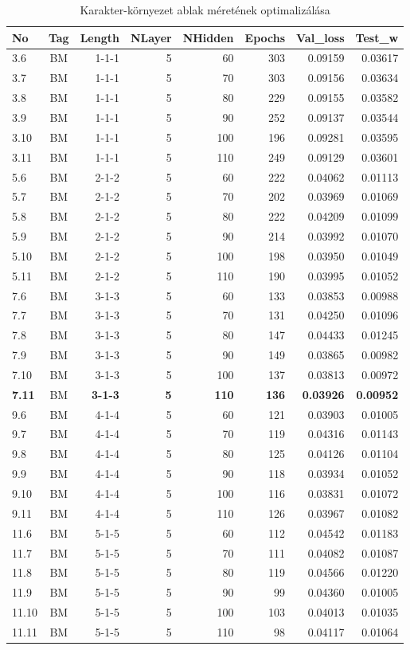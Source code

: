 \documentclass[a4paper, magyar]{article}
\begin{document}
\begin{small}
\begin{table}[tp]\centering
\begin{tabular}{|l|c|r|r|r|r|r|r|}
			\hline
			No&Tag&Length&NLayer&NHidden&Epochs&Val\_loss&Test\_w\\
\hline\hline
3.6&BM&1-1-1&5&60&303&0.09159&0.03617\\
\hline
3.7&BM&1-1-1&5&70&303&0.09156&0.03634\\
\hline
3.8&BM&1-1-1&5&80&229&0.09155&0.03582\\
\hline
3.9&BM&1-1-1&5&90&252&0.09137&0.03544\\
\hline
3.10&BM&1-1-1&5&100&196&0.09281&0.03595\\
\hline
3.11&BM&1-1-1&5&110&249&0.09129&0.03601\\
\hline
5.6&BM&2-1-2&5&60&222&0.04062&0.01113\\
\hline
5.7&BM&2-1-2&5&70&202&0.03969&0.01069\\
\hline
5.8&BM&2-1-2&5&80&222&0.04209&0.01099\\
\hline
5.9&BM&2-1-2&5&90&214&0.03992&0.01070\\
\hline
5.10&BM&2-1-2&5&100&198&0.03950&0.01049\\
\hline
5.11&BM&2-1-2&5&110&190&0.03995&0.01052\\
\hline
7.6&BM&3-1-3&5&60&133&0.03853&0.00988\\
\hline
7.7&BM&3-1-3&5&70&131&0.04250&0.01096\\
\hline
7.8&BM&3-1-3&5&80&147&0.04433&0.01245\\
\hline
7.9&BM&3-1-3&5&90&149&0.03865&0.00982\\
\hline
7.10&BM&3-1-3&5&100&137&0.03813&0.00972\\
\hline
\textbf{7.11}&BM&\textbf{3-1-3}&\textbf{5}&\textbf{110}&\textbf{136}&\textbf{0.03926}&\textbf{0.00952}\\
\hline
9.6&BM&4-1-4&5&60&121&0.03903&0.01005\\
\hline
9.7&BM&4-1-4&5&70&119&0.04316&0.01143\\
\hline
9.8&BM&4-1-4&5&80&125&0.04126&0.01104\\
\hline
9.9&BM&4-1-4&5&90&118&0.03934&0.01052\\
\hline
9.10&BM&4-1-4&5&100&116&0.03831&0.01072\\
\hline
9.11&BM&4-1-4&5&110&126&0.03967&0.01082\\
\hline
11.6&BM&5-1-5&5&60&112&0.04542&0.01183\\
\hline
11.7&BM&5-1-5&5&70&111&0.04082&0.01087\\
\hline
11.8&BM&5-1-5&5&80&119&0.04566&0.01220\\
\hline
11.9&BM&5-1-5&5&90&99&0.04360&0.01005\\
\hline
11.10&BM&5-1-5&5&100&103&0.04013&0.01035\\
\hline
11.11&BM&5-1-5&5&110&98&0.04117&0.01064\\
\hline
\end{tabular}
\caption{Karakter-környezet ablak méretének optimalizálása}
\label{tab:winoptim}
\end{table}
\end{small}
\newpage


\end{document}
